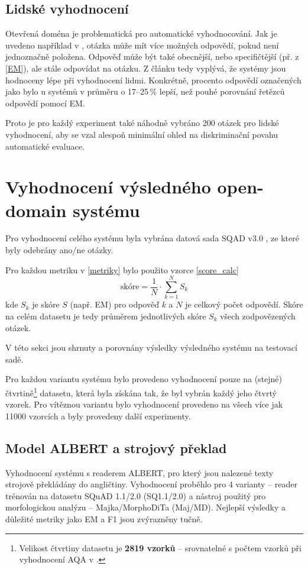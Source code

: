 \subsection{Lidské vyhodnocení}
Otevřená doména je problematická pro automatické vyhodnocování. Jak je uvedeno například v \cite{min2021neurips}, otázka může mít více možných odpovědí, pokud není jednoznačně položena. Odpověď může být také obecnější, nebo specifičtější (př. z \ref{EM}), ale stále odpovídat na otázku. Z článku \cite{min2021neurips} tedy vyplývá, že systémy jsou hodnoceny lépe při vyhodnocení lidmi. Konkrétně, procento odpovědí označených jako  bylo u systémů v průměru o 17--25\,\% lepší, než pouhé porovnání řetězců odpovědí pomocí EM.\par
Proto je pro každý experiment také náhodně vybráno 200 otázek pro lidské vyhodnocení, aby se vzal alespoň minimální ohled na diskriminační povahu automatické evaluace.

\section{Vyhodnocení výsledného open-domain systému}
Pro vyhodnocení celého systému byla vybrána datová sada SQAD v3.0 \cite{sqad}, ze které byly odebrány ano/ne otázky.\par
Pro každou metriku v \ref{metriky} bylo použito vzorce \ref{score_calc}
\begin{equation}
    \label{score_calc}
    \text{skóre} = \frac{1}{N}\cdot \sum^N_{k=1} S_k
\end{equation}
kde $S_k$ je skóre $S$ (např. EM) pro odpověď $k$ a $N$ je celkový počet odpovědí. Skóre na celém datasetu je tedy průměrem jednotlivých skóre $S_k$ všech zodpovězených otázek.\par
V této sekci jsou shrnuty a porovnány výsledky výsledného systému na testovací sadě.\par
Pro každou variantu systému bylo provedeno vyhodnocení pouze na (stejné) čtvrtině\footnote{Velikost čtvrtiny datasetu je \textbf{2819 vzorků} -- srovnatelné s počtem vzorků při vyhodnocení AQA v \cite{aqa2018}.} datasetu, která byla získána tak, že byl vybrán každý jeho čtvrtý vzorek. Pro vítěznou variantu bylo vyhodnocení provedeno na všech více jak 11000 vzorcích a byly provedeny další experimenty.

\subsection{Model ALBERT a strojový překlad}
\label{albert_eval}
Vyhodnocení systému s readerem ALBERT, pro který jsou nalezené texty strojově překládány do angličtiny. Vyhodnocení proběhlo pro 4 varianty -- reader trénován na datasetu SQuAD 1.1/2.0 (SQ1.1/2.0) a nástroj použitý pro morfologickou analýzu -- Majka/MorphoDiTa (Maj/MD). Nejlepší výsledky a důležité metriky jako EM a F1 jsou zvýrazněny tučně.

